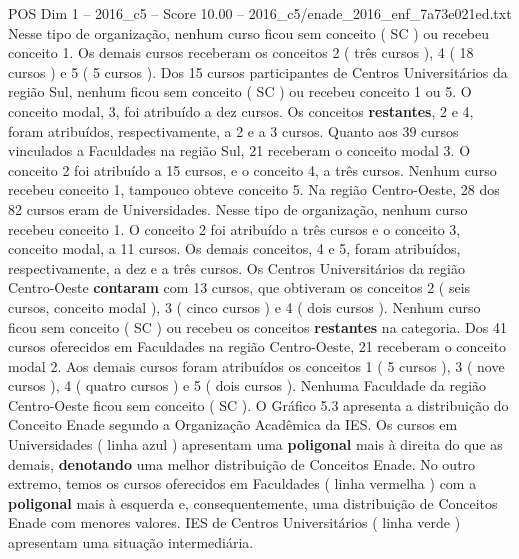 \begin{textsample}{POS Dim 1 – 2016\_c5 – Score 10.00 – 2016\_c5/enade\_2016\_enf\_7a73e021ed.txt}
Nesse tipo de organização, nenhum curso ficou sem conceito ( SC ) ou recebeu conceito 1.
Os demais cursos receberam os conceitos 2 ( três cursos ), 4 ( 18 cursos ) e 5 ( 5 cursos ).
Dos 15 cursos participantes de Centros Universitários da região Sul, nenhum ficou sem conceito ( SC ) ou recebeu conceito 1 ou 5.
O conceito modal, 3, foi atribuído a dez cursos.
Os conceitos \textbf{restantes}, 2 e 4, foram atribuídos, respectivamente, a 2 e a 3 cursos.
Quanto aos 39 cursos vinculados a Faculdades na região Sul, 21 receberam o conceito modal 3.
O conceito 2 foi atribuído a 15 cursos, e o conceito 4, a três cursos.
Nenhum curso recebeu conceito 1, tampouco obteve conceito 5.
Na região Centro-Oeste, 28 dos 82 cursos eram de Universidades.
Nesse tipo de organização, nenhum curso recebeu conceito 1.
O conceito 2 foi atribuído a três cursos e o conceito 3, conceito modal, a 11 cursos.
Os demais conceitos, 4 e 5, foram atribuídos, respectivamente, a dez e a três cursos.
Os Centros Universitários da região Centro-Oeste \textbf{contaram} com 13 cursos, que obtiveram os conceitos 2 ( seis cursos, conceito modal ), 3 ( cinco cursos ) e 4 ( dois cursos ).
Nenhum curso ficou sem conceito ( SC ) ou recebeu os conceitos \textbf{restantes} na categoria.
Dos 41 cursos oferecidos em Faculdades na região Centro-Oeste, 21 receberam o conceito modal 2.
Aos demais cursos foram atribuídos os conceitos 1 ( 5 cursos ), 3 ( nove cursos ), 4 ( quatro cursos ) e 5 ( dois cursos ).
Nenhuma Faculdade da região Centro-Oeste ficou sem conceito ( SC ).
O Gráfico 5.3 apresenta a distribuição do Conceito Enade segundo a Organização Acadêmica da IES.
Os cursos em Universidades ( linha azul ) apresentam uma \textbf{poligonal} mais à direita do que as demais, \textbf{denotando} uma melhor distribuição de Conceitos Enade.
No outro extremo, temos os cursos oferecidos em Faculdades ( linha vermelha ) com a \textbf{poligonal} mais à esquerda e, consequentemente, uma distribuição de Conceitos Enade com menores valores.
IES de Centros Universitários ( linha verde ) apresentam uma situação intermediária.

\end{textsample}

